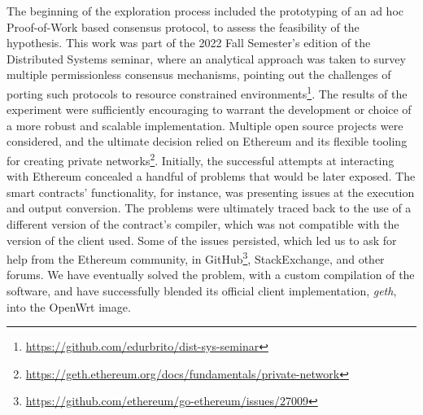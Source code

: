 The beginning of the exploration process included the prototyping of an ad hoc Proof-of-Work based consensus protocol, to assess the feasibility of the hypothesis. This work was part of the 2022 Fall Semester's edition of the Distributed Systems seminar, where an analytical approach was taken to survey multiple permissionless consensus mechanisms, pointing out the challenges of porting such protocols to resource constrained environments\footnote{\url{https://github.com/edurbrito/dist-sys-seminar}}. The results of the experiment were sufficiently encouraging to warrant the development or choice of a more robust and scalable implementation. Multiple open source projects were considered, and the ultimate decision relied on Ethereum and its flexible tooling for creating private networks\footnote{\url{https://geth.ethereum.org/docs/fundamentals/private-network}}. Initially, the successful attempts at interacting with Ethereum concealed a handful of problems that would be later exposed. The smart contracts' functionality, for instance, was presenting issues at the execution and output conversion. The problems were ultimately traced back to the use of a different version of the contract's compiler, which was not compatible with the version of the client used. Some of the issues persisted, which led us to ask for help from the Ethereum community, in GitHub\footnote{\url{https://github.com/ethereum/go-ethereum/issues/27009}}, StackExchange, and other forums. We have eventually solved the problem, with a custom compilation of the software, and have successfully blended its official client implementation, \emph{geth}, into the OpenWrt image.

